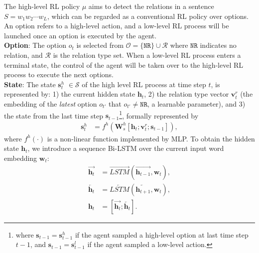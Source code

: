 \documentclass[letterpaper]{article} %
\theoremstyle{definition}
\begin{document}
The high-level RL policy $\mu$ aims to detect the relations in a sentence $S = w_1 w_2 \cdots w_L$, which can be regarded as a conventional RL policy over options. An option refers to a high-level action, and a low-level RL process will be launched once an option is executed by the agent.
\\
\textbf{Option}: The option $o_t$ is selected from $\mathcal{O} = \{ \texttt{NR} \} \cup \mathcal{R}$ where $\texttt{NR}$ indicates no relation, and $\mathcal{R}$ is the relation type set. When a low-level RL process enters a terminal state, the control of the agent will be taken over to the high-level RL process to execute the next options.
\\
\textbf{State}: The state $\mathbf{s}_t^h$ $\in \mathcal{S}$ of the high level RL process at time step $t$, is represented by: 1) the current hidden state $\mathbf{h}_t$, 2) the relation type vector $\mathbf{v}_t^r$ (the embedding of the \textit{latest} option $o_{t'}$ that $o_{t'} \not= \texttt{NR}$, a learnable parameter), and 3) the state from the last time step $\mathbf{s}_{t-1}$\footnote{where $\mathbf{s}_{t-1} = \mathbf{s}_{t-1}^h$ if the agent sampled a high-level option at last time step $t-1$, and $\mathbf{s}_{t-1} = \mathbf{s}_{t-1}^l$ if the agent sampled a low-level action.}, formally represented by
\begin{equation}\label{state_high}
    \begin{split}
        \mathbf{s}_t^h &= f^h(\mathbf{W}_s^h [ \mathbf{h}_t ; \mathbf{v}_t^r ; \mathbf{s}_{t-1}]),
    \end{split}
\end{equation}
where $f^h(\cdot)$ is a non-linear function implemented by MLP. To obtain the hidden state $\mathbf{h}_t$, we introduce a sequence Bi-LSTM over the current input word embedding $\mathbf{w}_t$:
%
\begin{equation}\label{LSTM}
    \begin{split}
        \overrightarrow{\mathbf{h}_t} &= \overrightarrow{LSTM}(\overrightarrow{\mathbf{h}_{t-1}}, \mathbf{w}_t), \\
        \overleftarrow{\mathbf{h}_t} &= \overleftarrow{LSTM}(\overleftarrow{\mathbf{h}_{t+1}}, \mathbf{w}_t), \\
        \mathbf{h}_t &= [ \overrightarrow{\mathbf{h}_t} ; \overleftarrow{\mathbf{h}_t} ].
    \end{split}
\end{equation}
\end{document}
